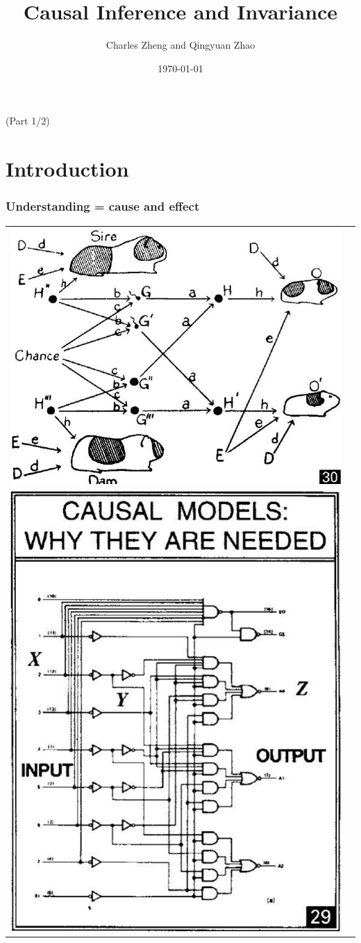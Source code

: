 \documentclass{beamer}
\title[Informal]{Causal Inference and Invariance}
\author{Charles Zheng and Qingyuan Zhao}
\institute[Stanford]
{Stanford University}
\date{\today}
\begin{document}
\begin{frame}
\titlepage
(Part 1/2)
\end{frame}

\section{Introduction}

\begin{frame}
\frametitle{Understanding = cause and effect}
\begin{tabular}{cc}
\includegraphics[scale=0.13]{../images/pearl30.png}& \\
\includegraphics[scale=0.17]{../images/pearl29.png} &

\end{tabular}
\end{frame}
\end{document}
